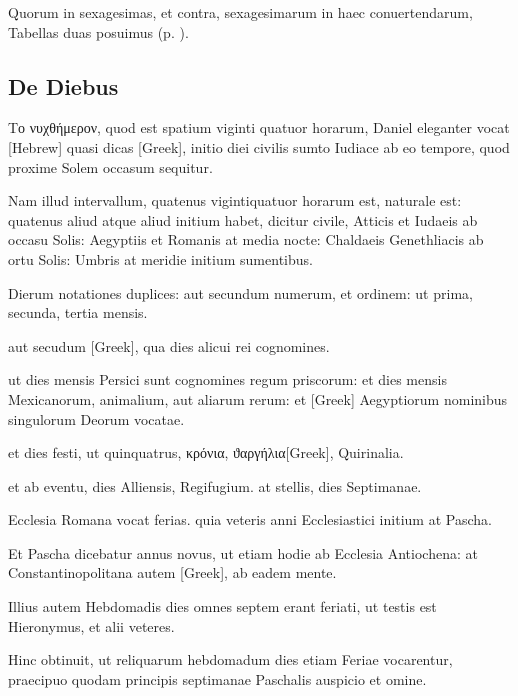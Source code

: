 Quorum in sexagesimas, et
contra, sexagesimarum in haec conuertendarum, Tabellas duas posuimus
 (p. \pageref{tab:convertendi_ostenta}).


\subsection{De Diebus}

\textgreek{Το νυχθήμερον},
quod est spatium viginti quatuor horarum, Daniel
eleganter vocat \texthebrew{[Hebrew]} quasi dicas
\textgreek{[Greek]}, initio diei civilis
sumto Iudiace ab eo tempore, quod proxime Solem occasum
sequitur.

Nam illud intervallum, quatenus vigintiquatuor horarum est,
naturale est: quatenus aliud atque aliud initium habet, dicitur civile,
Atticis et Iudaeis ab occasu Solis: Aegyptiis et Romanis at media nocte:
Chaldaeis Genethliacis ab ortu Solis: Umbris at meridie initium
sumentibus.

Dierum notationes duplices: aut secundum numerum, et
ordinem: ut prima, secunda, tertia mensis.

aut secudum \textgreek{[Greek]},
qua dies alicui rei cognomines.

ut dies mensis Persici sunt cognomines
regum priscorum: et dies mensis Mexicanorum, animalium, aut aliarum
rerum: et \textgreek{[Greek]} Aegyptiorum nominibus singulorum Deorum
vocatae.

et dies festi, ut quinquatrus, \textgreek{κρόνια},
\textgreek{ϑαργήλια[Greek]}, Quirinalia.

et ab eventu, dies Alliensis, Regifugium. at stellis, dies Septimanae.

Ecclesia Romana vocat ferias. quia veteris anni Ecclesiastici initium
at Pascha.

Et Pascha dicebatur annus novus, ut etiam hodie ab Ecclesia
Antiochena: at Constantinopolitana autem \textgreek{[Greek]},
ab eadem mente.

Illius autem Hebdomadis dies omnes septem erant
feriati, ut testis est Hieronymus, et alii veteres.

Hinc obtinuit, ut reliquarum
hebdomadum dies etiam Feriae vocarentur, praecipuo quodam
principis septimanae Paschalis auspicio et omine.

